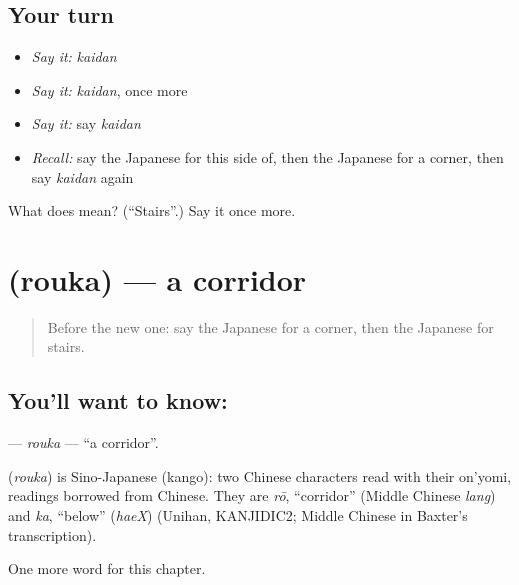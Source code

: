 \subsection*{Your turn}
\begin{itemize}
\raggedright
  \item \emph{Say it:} \emph{kaidan}
  \item \emph{Say it:} \emph{kaidan}, once more
  \item \emph{Say it:} say \emph{kaidan}
  \item \emph{Recall:} say the Japanese for this side of, then the Japanese for a corner, then say \emph{kaidan} again
\end{itemize}

\begin{tcolorbox}[breakable,colback=teal!4,colframe=teal!35!black,title={Before you move on}]
What does  mean? (\textquotedblleft{}Stairs\textquotedblright{}.) Say it once more.
\end{tcolorbox}
\section[\texorpdfstring{\ja{ろうか} (rouka)}{ろうか (rouka)}]{ (rouka) — a corridor}

\label{lesson:JA-C79-rouka}



\begin{quote}
Before the new one: say the Japanese for a corner, then the Japanese for stairs.
\end{quote}

\subsection*{You'll want to know: }
\textbf{} — \emph{rouka} — \textquotedblleft{}a corridor\textquotedblright{}.

\begin{cousinweb}
\textbf{} (\emph{rouka}) is Sino-Japanese (kango): two Chinese characters read with their on'yomi, readings borrowed from Chinese. They are \emph{rō}, \textquotedblleft{}corridor\textquotedblright{} (Middle Chinese \emph{lang}) and \emph{ka}, \textquotedblleft{}below\textquotedblright{} (\emph{haeX}) (Unihan, KANJIDIC2; Middle Chinese in Baxter's transcription).
\end{cousinweb}

\begin{grammarlens}[title={What you've built}]
One more word for this chapter.
\end{grammarlens}

